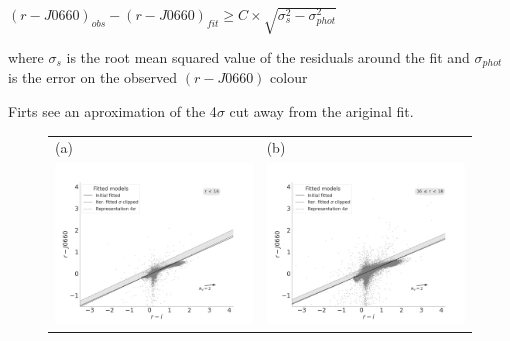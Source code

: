 \documentclass[fleqn,usenatbib]{mnras}
\begin{document}
 $(r - J0660)_{obs} - (r - J0660)_{fit} \geq C \times \sqrt{\sigma^2_s - \sigma^2_{phot}}$ 
 
where $\sigma_s$ is the root mean squared value of the residuals around
the fit and $\sigma_{phot}$ is the error on the observed $(r - J0660)$ colour

Firts see an aproximation of the  4$\sigma$ cut away from the ariginal fit.

\begin{figure}
  \setlength\tabcolsep{0pt}
  \begin{tabular}{ll}
    (a) & (b) \\
    \includegraphics[trim=10 0 65 20, clip]{Figs/diagram-DR3-errorFlag0-3f-16r}
    & \includegraphics[trim=10 0 65 20, clip]{Figs/diagram-DR3-errorFlag0-3f-16r18}\\

\end{tabular}
\end{figure}
\end{document}
